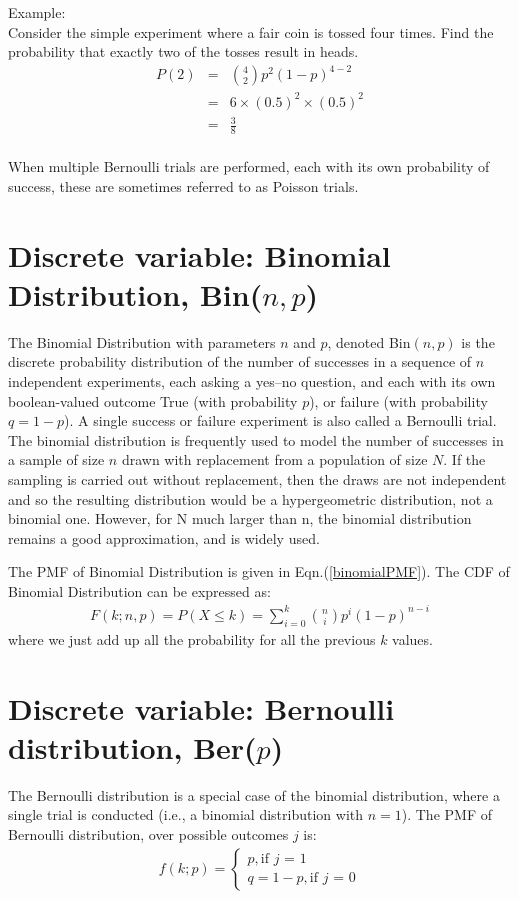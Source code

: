 Example:\\
Consider the simple experiment where a fair coin is tossed four times. Find the probability that exactly two of the tosses result in heads.\\
\begin{eqnarray*}
P(2) &=& \binom{4}{2}p^2 (1-p)^{4-2} \\ 
&=& 6 \times (0.5)^2 \times (0.5)^2 \\ 
&=& \frac{3}{8}\\ 
\label{coin}
\end{eqnarray*}

When multiple Bernoulli trials are performed, each with its own probability of success, these are sometimes referred to as Poisson trials.

\section{Discrete variable: Binomial Distribution, Bin($n, p$)}

The Binomial Distribution with parameters $n$ and $p$, denoted Bin$(n,p)$ is the discrete probability distribution of the number of successes in a sequence of $n$ independent experiments, each asking a yes–no question, and each with its own boolean-valued outcome True (with probability $p$), or failure (with probability $q = 1- p$). A single success or failure experiment is also called a Bernoulli trial. \\

The binomial distribution is frequently used to model the number of successes in a sample of size $n$ drawn with replacement from a population of size $N$. If the sampling is carried out without replacement, then the draws are not independent and so the resulting distribution would be a hypergeometric distribution, not a binomial one. However, for N much larger than n, the binomial distribution remains a good approximation, and is widely used.

The PMF of Binomial Distribution is given in Eqn.(\ref{binomialPMF}). The CDF of Binomial Distribution can be expressed as:
\begin{eqnarray}
F(k; n, p) = P (X \le k) = \sum_{i=0}^{k} \binom{n}{i} p^i (1-p)^{n-i}
\label{binomialCDF}
\end{eqnarray}
where we just add up all the probability for all the previous $k$ values.

\section{Discrete variable: Bernoulli distribution, Ber($p$)}
The Bernoulli distribution is a special case of the binomial distribution, where a single trial is conducted (i.e., a binomial distribution with $n = 1$). The PMF of Bernoulli distribution, over possible outcomes $j$ is:
\begin{eqnarray}
f(k;p) = \begin{cases}
p,             \text{if $j$ = 1}\\
q = 1-p,      \text{if $j$ = 0}
\end{cases}
\end{eqnarray}

